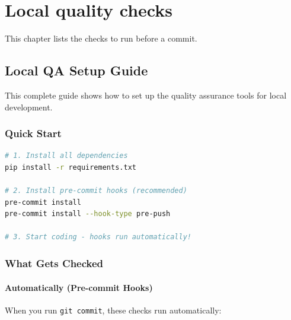 \chapter{Local quality checks}\label{um:ch:local-quality-checks}

This chapter lists the checks to run before a commit.

\section{Local QA Setup Guide}\label{um:guide:local-qa}

This complete guide shows how to set up the quality assurance tools for local development.

\subsection{Quick Start}\label{um:guide:local-qa:quick-start}

\begin{lstlisting}[language=bash]
# 1. Install all dependencies
pip install -r requirements.txt

# 2. Install pre-commit hooks (recommended)
pre-commit install
pre-commit install --hook-type pre-push

# 3. Start coding - hooks run automatically!
\end{lstlisting}

\subsection{What Gets Checked}\label{um:guide:local-qa:what-gets-checked}

\subsubsection{Automatically (Pre-commit Hooks)}\label{um:guide:local-qa:automatically-pre-commit-hooks}

When you run \texttt{git\ commit}, these checks run automatically:

